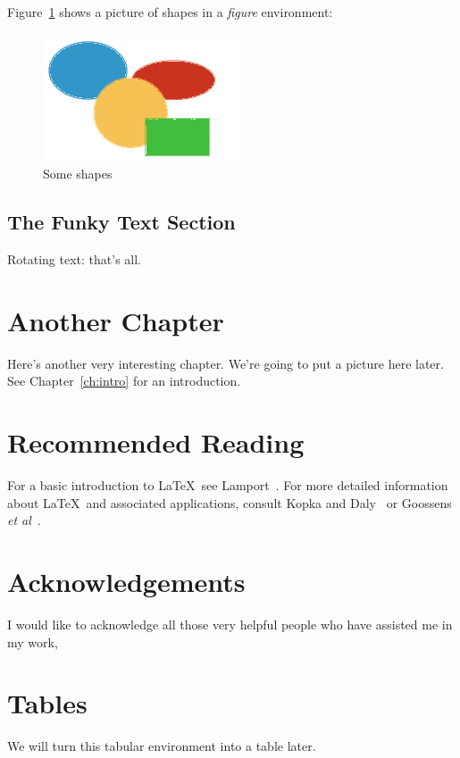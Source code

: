 \documentclass[12pt]{scrbook}
\begin{document}
Figure~\ref{fig:shapes} shows a picture of shapes in a \emph{figure} environment:

\begin{figure}[htbp]
    \centering
    \includegraphics{shapes}
    \caption{Some shapes}
    \label{fig:shapes}
\end{figure}

\section{The Funky Text Section}
Rotating text: 
that's all.


\chapter{Another Chapter}
\label{ch:another}

Here's another very interesting chapter.
We're going to put a picture here later.
See Chapter~\ref{ch:intro} for an introduction.

\chapter{Recommended Reading}
For a basic introduction to \LaTeX\ see Lamport~\cite{lamport94}. For more
detailed information about \LaTeX\ and associated applications, consult
Kopka and Daly~\cite{kopka95} or Goossens \emph{et al}~\cite{goossens94}.

\chapter*{Acknowledgements}

I would like to acknowledge all those
very helpful people who have assisted me in my work,

\appendix

\chapter{Tables}
We will turn this tabular environment into a table later.
\end{document}
